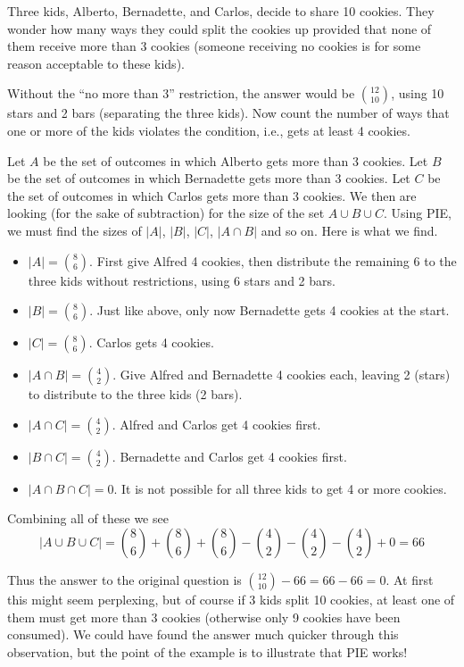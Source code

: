 \documentclass[12pt]{article}
\begin{document}
\begin{example}
Three kids, Alberto, Bernadette, and Carlos, decide to share 10 cookies.  They wonder how many ways they could split the cookies up provided that none of them receive more than 3 cookies (someone receiving no cookies is for some reason acceptable to these kids).

\begin{solution}
Without the ``no more than 3'' restriction, the answer would be ${12 \choose 10}$, using 10 stars and 2 bars (separating the three kids).  Now count the number of ways that one or more of the kids violates the condition, i.e., gets at least 4 cookies.

Let $A$ be the set of outcomes in which Alberto gets more than 3 cookies.  Let $B$ be the set of outcomes in which Bernadette gets more than 3 cookies.  Let $C$ be the set of outcomes in which Carlos gets more than 3 cookies.  We then are looking (for the sake of subtraction) for the size of the set $A \cup B \cup C$.  Using PIE, we must find the sizes of $|A|$, $|B|$, $|C|$, $|A\cap B|$ and so on.  Here is what we find.

\begin{itemize}
\item[] $|A| = {8 \choose 6}$.  First give Alfred 4 cookies, then distribute the remaining 6 to the three kids without restrictions, using 6 stars and 2 bars.
\item[] $|B| = {8 \choose 6}$.  Just like above, only now Bernadette gets 4 cookies at the start.
\item[] $|C| = {8 \choose 6}$.  Carlos gets 4 cookies.

\item[] $|A \cap B| = {4 \choose 2}$.  Give Alfred and Bernadette 4 cookies each, leaving 2 (stars) to distribute to the three kids (2 bars).

\item[] $|A \cap C| = {4 \choose 2}$.  Alfred and Carlos get 4 cookies first.  

\item[] $|B \cap C| = {4 \choose 2}$.  Bernadette and Carlos get 4 cookies first.

\item[] $|A \cap B \cap C| = 0$.  It is not possible for all three kids to get 4 or more cookies.
\end{itemize}

Combining all of these we see
\[|A \cup B \cup C| = {8 \choose 6} + {8 \choose 6} + {8 \choose 6} - {4 \choose 2} - {4 \choose 2} - {4 \choose 2} + 0 = 66\]

Thus the answer to the original question is ${12 \choose 10} - 66 = 66 - 66 = 0$.  At first this might seem perplexing, but of course if 3 kids split 10 cookies, at least one of them must get more than 3 cookies (otherwise only 9 cookies have been consumed).  We could have found the answer much quicker through this observation, but the point of the example is to illustrate that PIE works!
\end{solution}
\end{example}
\end{document}
